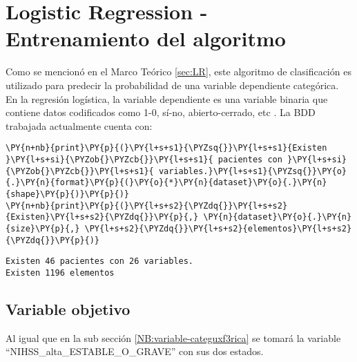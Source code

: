     \hypertarget{logistic-regression---entrenamiento-del-algoritmo}{%
\section{Logistic Regression - Entrenamiento del algoritmo}\label{logistic-regression---entrenamiento-del-algoritmo}}

	Como se mencionó en el Marco Teórico \ref{sec:LR}, este algoritmo de clasificación es utilizado para predecir la probabilidad de una variable dependiente categórica. En la regresión logística, la variable dependiente es una variable binaria que contiene datos codificados como 1-0, sí-no, abierto-cerrado, etc \cite{cien2001}.
	La BDD trabajada actualmente cuenta con:

    \begin{tcolorbox}[breakable, size=fbox, boxrule=1pt, pad at break*=1mm,colback=cellbackground, colframe=cellborder]
\begin{Verbatim}[commandchars=\\\{\}]
\PY{n+nb}{print}\PY{p}{(}\PY{l+s+s1}{\PYZsq{}}\PY{l+s+s1}{Existen }\PY{l+s+si}{\PYZob{}\PYZcb{}}\PY{l+s+s1}{ pacientes con }\PY{l+s+si}{\PYZob{}\PYZcb{}}\PY{l+s+s1}{ variables.}\PY{l+s+s1}{\PYZsq{}}\PY{o}{.}\PY{n}{format}\PY{p}{(}\PY{o}{*}\PY{n}{dataset}\PY{o}{.}\PY{n}{shape}\PY{p}{)}\PY{p}{)}
\PY{n+nb}{print}\PY{p}{(}\PY{l+s+s2}{\PYZdq{}}\PY{l+s+s2}{Existen}\PY{l+s+s2}{\PYZdq{}}\PY{p}{,} \PY{n}{dataset}\PY{o}{.}\PY{n}{size}\PY{p}{,} \PY{l+s+s2}{\PYZdq{}}\PY{l+s+s2}{elementos}\PY{l+s+s2}{\PYZdq{}}\PY{p}{)}
\end{Verbatim}
\end{tcolorbox}

    \begin{Verbatim}[commandchars=\\\{\}]
Existen 46 pacientes con 26 variables.
Existen 1196 elementos
    \end{Verbatim}

    \hypertarget{variable-categuxf3rica}{%
\subsection{Variable objetivo}\label{variable-categuxf3rica}}

	Al igual que en la sub sección \ref{NB:variable-categuxf3rica} se tomará la variable ``NIHSS\_alta\_ESTABLE\_O\_GRAVE'' con sus dos estados.

